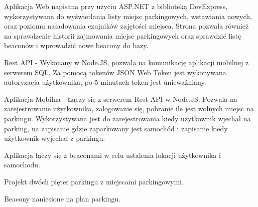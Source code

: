 \documentclass[12pt,a4paper]{article}
\begin{document}
Aplikacja Web napisana przy użyciu ASP.NET z biblioteką DevExpress, wykorzystywana do wyświetlania listy miejsc parkingowych, wstawiania nowych, oraz poziomu naładowania czujników zajętości miejsca. Strona pozwala również na sprawdzenie historii zajmowania miejsc parkingowych oraz sprawdzić listę beaconów i wprowadzić nowe beacony do bazy.

Rest API - Wykonany w Node.JS, pozwala na komunikację aplikacji mobilnej z serwerem SQL. Za pomocą tokenów JSON Web Token jest wykonywana autoryzacja użytkownika, po 5 minutach token jest unieważniany.

Aplikacja Mobilna - Łączy się z serwerem Rest API w Node.JS. Pozwala na zarejestrowanie użytkownika, zalogowanie się, pobranie ile jest wolnych miejsc na parkingu. Wykorzystywana jest do zarejestrowania kiedy użytkownik wjechał na parking, na zapisanie gdzie zaparkowany jest samochód i zapisanie kiedy użytkownik wyjechał z parkingu.

Aplikacja łączy się z beaconami w celu ustalenia lokacji użytkownika i samochodu.

Projekt dwóch pięter parkingu z miejscami parkingowymi.



Beacony naniesione na plan parkingu.
\end{document}

